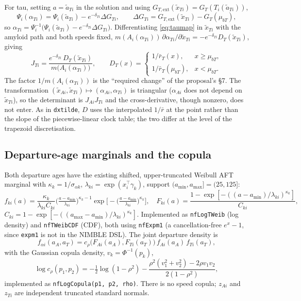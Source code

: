 \documentclass[11pt]{article}
\newcommand{\code}[1]{\texttt{#1}}
\newcommand{\rbar}{\bar r}
\begin{document}
For tau, setting $a=\tilde a_{Ti}$ in the solution and using $G_{T,\mathrm{ext}}(\tilde x_{Ti})=G_T(T_i(\tilde a_{Ti}))$,
\begin{equation}
\Psi_i(\alpha_{Ti})=\Psi_i(\tilde a_{Ti})-e^{-\delta_{Ti}}\Delta G_{Ti},\qquad
\Delta G_{Ti}=G_{T,\mathrm{ext}}(\tilde x_{Ti})-G_T(\mu_{bT}),
\label{eq:taumap}
\end{equation}
so $\alpha_{Ti}=\Psi_i^{-1}\big(\Psi_i(\tilde a_{Ti})-e^{-\delta_{Ti}}\Delta G_{Ti}\big)$.
Differentiating \eqref{eq:taumap} in $\tilde x_{Ti}$ with the amyloid path and both
speeds fixed, $m(A_i(\alpha_{Ti}))\,\partial\alpha_{Ti}/\partial\tilde x_{Ti}=-e^{-\delta_{Ti}}D_T(\tilde x_{Ti})$, giving
\begin{equation}
J_{Ti}=\frac{e^{-\delta_{Ti}}\,D_T(\tilde x_{Ti})}{m\big(A_i(\alpha_{Ti})\big)},\qquad
D_T(x)=\begin{cases}1/\rbar_T(x), & x\ge\mu_{bT},\\ 1/\rbar_T(\mu_{bT}), & x<\mu_{bT}.\end{cases}
\label{eq:jac}
\end{equation}
The factor $1/m(A_i(\alpha_{Ti}))$ is the ``required change'' of the proposal's
\S7. The transformation $(\tilde x_{Ai},\tilde x_{Ti})\mapsto(\alpha_{Ai},\alpha_{Ti})$
is triangular ($\alpha_{Ai}$ does not depend on $\tilde x_{Ti}$), so the determinant
is $J_{Ai}J_{Ti}$ and the cross-derivative, though nonzero, does not enter.
As in \code{dxtilde}, $D$ uses the interpolated $1/\rbar$ at the point rather
than the slope of the piecewise-linear clock table; the two differ at the level of
the trapezoid discretisation.

\subsection{Departure-age marginals and the copula}

Both departure ages have the existing shifted, upper-truncated Weibull AFT
marginal with $\kappa_k=1/\sigma_{\alpha k}$, $\lambda_{ki}=\exp(x_i^\top\gamma_k)$,
support $(a_{\min},a_{\max}]=(25,125]$:
\[
f_{ki}(a)=\frac{\kappa_k}{\lambda_{ki}C_{ki}}\Big(\tfrac{a-a_{\min}}{\lambda_{ki}}\Big)^{\kappa_k-1}
\exp\Big[-\Big(\tfrac{a-a_{\min}}{\lambda_{ki}}\Big)^{\kappa_k}\Big],\quad
F_{ki}(a)=\frac{1-\exp[-((a-a_{\min})/\lambda_{ki})^{\kappa_k}]}{C_{ki}},
\]
$C_{ki}=1-\exp[-((a_{\max}-a_{\min})/\lambda_{ki})^{\kappa_k}]$.
Implemented as \code{nfLogTWeib} (log density) and \code{nfTWeibCDF} (CDF), both
using \code{nfExpm1} (a cancellation-free $e^x-1$, since \code{expm1} is not in
the NIMBLE DSL). The joint departure density is
\[
f_{\alpha i}(a_A,a_T)=c_\rho\big(F_{Ai}(a_A),F_{Ti}(a_T)\big)\,f_{Ai}(a_A)\,f_{Ti}(a_T),
\]
with the Gaussian copula density, $v_k=\Phi^{-1}(p_k)$,
\[
\log c_\rho(p_1,p_2)=-\tfrac12\log(1-\rho^2)-\frac{\rho^2(v_1^2+v_2^2)-2\rho v_1v_2}{2(1-\rho^2)},
\]
implemented as \code{nfLogCopula(p1, p2, rho)}. There is no speed copula; $z_{Ai}$
and $z_{Ti}$ are independent truncated standard normals.
\end{document}
